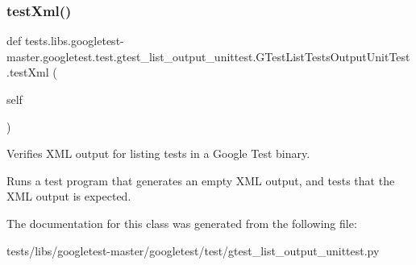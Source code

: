 \subsubsection{\texorpdfstring{test\+Xml()}{testXml()}}
{\footnotesize\ttfamily def tests.\+libs.\+googletest-\/master.\+googletest.\+test.\+gtest\+\_\+list\+\_\+output\+\_\+unittest.\+G\+Test\+List\+Tests\+Output\+Unit\+Test.\+test\+Xml (\begin{DoxyParamCaption}\item[{}]{self }\end{DoxyParamCaption})}

\begin{DoxyVerb}Verifies XML output for listing tests in a Google Test binary.

Runs a test program that generates an empty XML output, and
tests that the XML output is expected.
\end{DoxyVerb}
 

The documentation for this class was generated from the following file\+:\begin{DoxyCompactItemize}
\item 
tests/libs/googletest-\/master/googletest/test/gtest\+\_\+list\+\_\+output\+\_\+unittest.\+py\end{DoxyCompactItemize}
